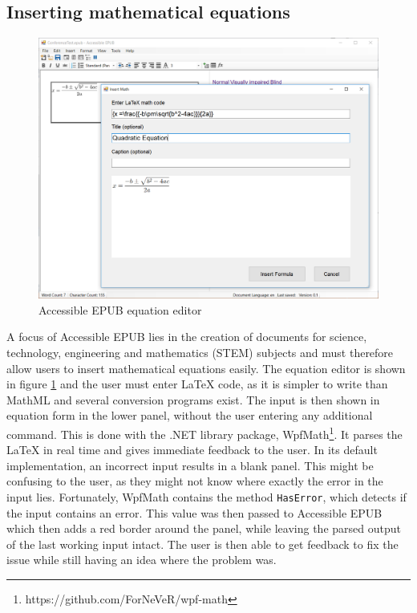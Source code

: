 \subsection{Inserting mathematical equations}

\begin{figure}[h]
	\centering
	\includegraphics[width=\textwidth*4/5]{figures/AccessibleEPUBequationNew.PNG}
	\caption{Accessible EPUB equation editor}
	\label{fig:equationEditor}
\end{figure}

A focus of Accessible EPUB lies in the creation of documents for science, technology, engineering and mathematics (STEM) subjects and must therefore allow users to insert mathematical equations easily. The equation editor is shown in figure \ref{fig:equationEditor} and the user must enter LaTeX code, as it is simpler to write than MathML and several conversion programs exist. The input is then shown in equation form in the lower panel, without the user entering any additional command. This is done with the .NET library package, WpfMath\footnote{https://github.com/ForNeVeR/wpf-math}. It parses the LaTeX in real time and gives immediate feedback to the user. In its default implementation, an incorrect input results in a blank panel. This might be confusing to the user, as they might not know where exactly the error in the input lies. Fortunately, WpfMath contains the method \lstinline|HasError|, which detects if the input contains an error. This value was then passed to Accessible EPUB which then adds a red border around the panel, while leaving the parsed output of the last working input intact. The user is then able to get feedback to fix the issue while still having an idea where the problem was. 

